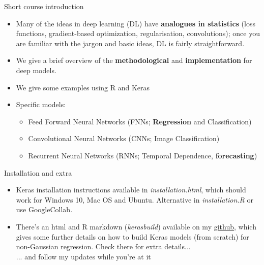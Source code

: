\documentclass{beamer}
\begin{document}
\begin{frame}{Short course introduction}
\begin{itemize}
\item Many of the ideas in deep learning (DL) have \textbf{analogues in statistics} (loss functions, gradient-based optimization, regularisation, convolutions); once you are familiar with the jargon and basic ideas, DL is fairly straightforward.
\vfill
\item We give a brief overview of the \textbf{methodological} and \textbf{implementation} for deep models.
\vfill
\item We give some examples using $\mathrm{R}$ and Keras
\vfill
\item Specific models:
\begin{itemize}
\item Feed Forward Neural Networks (FNNs; \textbf{Regression} and Classification)

\item Convolutional Neural Networks (CNNs; Image Classification)

\item Recurrent Neural Networks (RNNs; Temporal Dependence, \textbf{forecasting})
\end{itemize}
\end{itemize}
\end{frame}
\begin{frame}{Installation and extra}
\begin{itemize}
\item Keras installation instructions available in \textit{installation.html}, which should work for Windows 10, Mac OS and Ubuntu. Alternative in \textit{installation.R} or use GoogleCollab.
\vfill 
\item There's an html and R markdown (\textit{keras\textunderscore build}) available on my \href{https://github.com/Jbrich95/cde-RKeras-intro/tree/main/keras_build}{github}, which gives some further details on how to build Keras models (from scratch) for non-Gaussian regression. Check there for extra details...\\
\tiny ... and follow my updates while you're at it
\end{itemize}
\end{frame}
\end{document}
